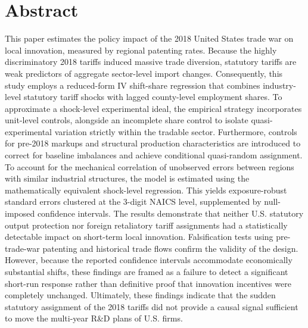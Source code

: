 \documentclass[12pt]{article}
\numberwithin{figure}{section}
\numberwithin{table}{section}
\begin{document}






\newpage
\section*{Abstract} %
This paper estimates the policy impact of the 2018 United States trade war on local innovation, measured by regional patenting rates. Because the highly discriminatory 2018 tariffs induced massive trade diversion, statutory tariffs are weak predictors of aggregate sector-level import changes. Consequently, this study employs a reduced-form IV shift-share regression that combines industry-level statutory tariff shocks with lagged county-level employment shares. To approximate a shock-level experimental ideal, the empirical strategy incorporates unit-level controls, alongside an incomplete share control to isolate quasi-experimental variation strictly within the tradable sector. Furthermore, controls for pre-2018 markups and structural production characteristics are introduced to correct for baseline imbalances and achieve conditional quasi-random assignment. To account for the mechanical correlation of unobserved errors between regions with similar industrial structures, the model is estimated using the mathematically equivalent shock-level regression. This yields exposure-robust standard errors clustered at the 3-digit NAICS level, supplemented by null-imposed confidence intervals. The results demonstrate that neither U.S. statutory output protection nor foreign retaliatory tariff assignments had a statistically detectable impact on short-term local innovation. Falsification tests using pre-trade-war patenting and historical trade flows confirm the validity of the design. However, because the reported confidence intervals accommodate economically substantial shifts, these findings are framed as a failure to detect a significant short-run response rather than definitive proof that innovation incentives were completely unchanged. Ultimately, these findings indicate that the sudden statutory assignment of the 2018 tariffs did not provide a causal signal sufficient to move the multi-year R\&D plans of U.S. firms.
\end{document}
